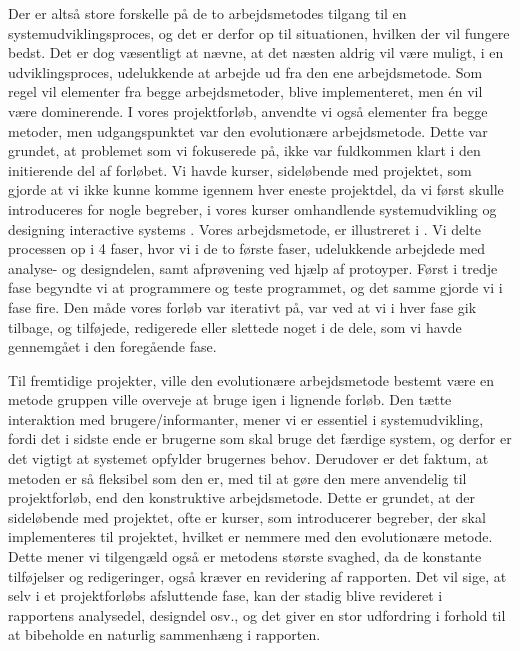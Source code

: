 Der er altså store forskelle på de to arbejdsmetodes tilgang til en systemudviklingsproces, og det er derfor op til situationen, hvilken der vil fungere bedst. Det er dog væsentligt at nævne, at det næsten aldrig vil være muligt, i en udviklingsproces, udelukkende at arbejde ud fra den ene arbejdsmetode. Som regel vil elementer fra begge arbejdsmetoder, blive implementeret, men én vil være dominerende. I vores projektforløb, anvendte vi også elementer fra begge metoder, men udgangspunktet var den evolutionære arbejdsmetode. Dette var grundet, at problemet som vi fokuserede på, ikke var fuldkommen klart i den initierende del af forløbet. Vi havde kurser, sideløbende med projektet, som gjorde at vi ikke kunne komme igennem hver eneste projektdel, da vi først skulle introduceres for nogle begreber, i vores kurser omhandlende systemudvikling \cite{ooad} og designing interactive systems \cite{deb}. Vores arbejdsmetode, er illustreret i . Vi delte processen op i 4 faser, hvor vi i de to første faser, udelukkende arbejdede med analyse- og designdelen, samt afprøvening ved hjælp af protoyper. Først i tredje fase begyndte vi at programmere og teste programmet, og det samme gjorde vi i fase fire. Den måde vores forløb var iterativt på, var ved at vi i hver fase gik tilbage, og tilføjede, redigerede eller slettede noget i de dele, som vi havde gennemgået i den foregående fase.

Til fremtidige projekter, ville den evolutionære arbejdsmetode bestemt være en metode gruppen ville overveje at bruge igen i lignende forløb. Den tætte interaktion med brugere/informanter, mener vi er essentiel i systemudvikling, fordi det i sidste ende er brugerne som skal bruge det færdige system, og derfor er det vigtigt at systemet opfylder brugernes behov. Derudover er det faktum, at metoden er så fleksibel som den er, med til at gøre den mere anvendelig til projektforløb, end den konstruktive arbejdsmetode. Dette er grundet, at der sideløbende med projektet, ofte er kurser, som introducerer begreber, der skal implementeres til projektet, hvilket er nemmere med den evolutionære metode. Dette mener vi tilgengæld også er metodens største svaghed, da de konstante tilføjelser og redigeringer, også kræver en revidering af rapporten. Det vil sige, at selv i et projektforløbs afsluttende fase, kan der stadig blive revideret i rapportens analysedel, designdel osv., og det giver en stor udfordring i forhold til at bibeholde en naturlig sammenhæng i rapporten. 

